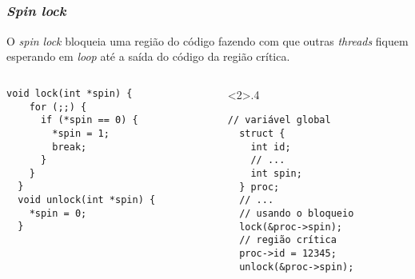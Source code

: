 
\subsection{\insertlecture}

\begin{frame}[fragile]
  \frametitle{{\em Spin lock}} \small O \alert{\em spin lock} bloqueia
  uma região do código fazendo com que outras {\em threads}
  fiquem esperando em {\em loop} até a saída do código da região crítica.\\
  \bigskip

  \begin{columns}
\begin{column}{.4\textwidth}
\begin{lstlisting}[framexleftmargin=5mm, frame=shadowbox,
    rulesepcolor=\color{red}]
  void lock(int *spin) {
    for (;;) {
      if (*spin == 0) {
        *spin = 1;
        break;
      }
    }
  }
  void unlock(int *spin) {
    *spin = 0;
  }
\end{lstlisting}
\end{column}
\begin{column}<2>{.4\textwidth}
  \begin{lstlisting}[framexleftmargin=5mm, frame=shadowbox,
    rulesepcolor=\color{blue}]
  // variável global
  struct {
    int id;
    // ...
    int spin;
  } proc;
  // ...
  // usando o bloqueio
  lock(&proc->spin);
  // região crítica
  proc->id = 12345;
  unlock(&proc->spin);
\end{lstlisting}
\end{column}
  \end{columns}
\end{frame}

